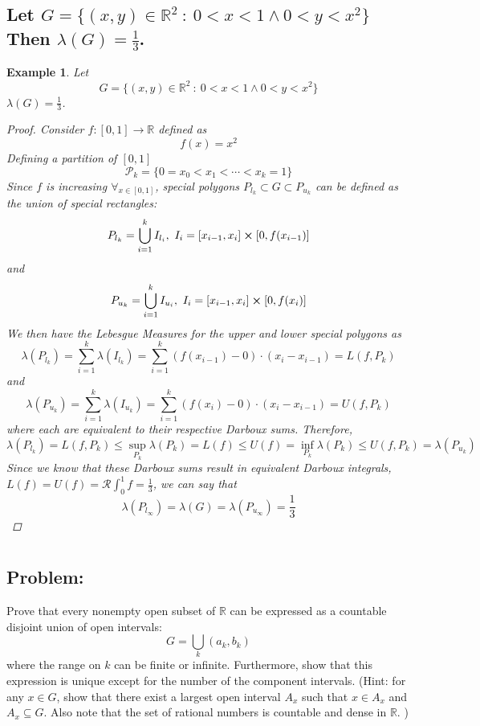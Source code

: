 \documentclass[]{article}
\newcommand{\R}{\mathbb{R}}
\newcommand{\st}{\ : \ }
\newtheorem{example}{Example}
\begin{document}
\subsection{
    Let $G = \{(x,y) \in \R^2 \st 0 < x < 1 \land 0 < y < x^2\}$
    Then $\lambda(G) = \frac{1}{3}$.
}
\begin{example}
    Let \[
        G = \{(x,y) \in \R^2 \st 0 < x < 1 \land 0 < y < x^2\}
    \]
    $\lambda(G) = \frac{1}{3}$.
    \begin{proof}
        Consider $f : [0,1] \to \R$ defined as \[
            f(x) = x^2
        \] Defining a partition of $[0,1]$ \[
            \mathcal{P}_k = \{
                0 = x_0 < x_1 < \cdots < x_k = 1
            \}
        \] Since $f$ is increasing $\forall_{x\in[0,1]}$, special polygons $P_{l_k} \subset G \subset P_{u_k}$ can be defined as the union of special rectangles:\[
            P_{l_k} = \bigcup_{i=1}^{k} I_{l_i}, \ I_i = [x_{i-1}, x_i] \cross [0,f(x_{i-1})]
        \] and \[
            P_{u_k} = \bigcup_{i=1}^{k} I_{u_i}, \ I_i = [x_{i-1}, x_{i}] \cross [0,f(x_{i})]
        \] We then have the Lebesgue Measures for the upper and lower special polygons as\[
            \lambda(P_{l_k}) 
            = \sum_{i=1}^{k} \lambda(I_{l_k}) 
            = \sum_{i=1}^{k} (f(x_{i-1}) - 0) \cdot (x_{i} - x_{i-1})
            = L(f, P_k)
        \] and \[
            \lambda(P_{u_k}) 
            = \sum_{i=1}^{k} \lambda(I_{u_k}) 
            = \sum_{i=1}^{k} (f(x_{i}) - 0) \cdot (x_{i} - x_{i-1})
            = U(f, P_k)
        \] where each are equivalent to their respective Darboux sums. 
        Therefore, \[
            \lambda(P_{l_k}) = L(f, P_k) \leq \sup_{P_k} \lambda(P_k) = L(f) \leq U(f) = \inf_{P_k} \lambda(P_k) \leq U(f,P_k) = \lambda(P_{u_k})
        \]
        Since we know that these Darboux sums result in equivalent Darboux integrals, $L(f) = U(f) = \mathcal{R}\int_{0}^{1} f = \frac{1}{3}$, we can say that \[
            \lambda(P_{l_\infty}) = \lambda(G) = \lambda(P_{u_\infty}) = \frac{1}{3}
        \]
    \end{proof}
\end{example}

\newpage
\section{}
\subsection*{Problem:}
Prove that every nonempty open subset of $\R$ can be expressed as a countable disjoint union of open intervals:\[
    G = \bigcup_{k} (a_k,b_k)
\] where the range on $k$ can be finite or infinite.
Furthermore, show that this expression is unique except for the number of the component intervals.
(Hint:
for any $x\in G$, show that there exist a largest open interval $A_x$ such that $x\in A_x$ and $A_x \subseteq G$.
Also note that the set of rational numbers is countable and dense in $\R$.
)
\end{document}
